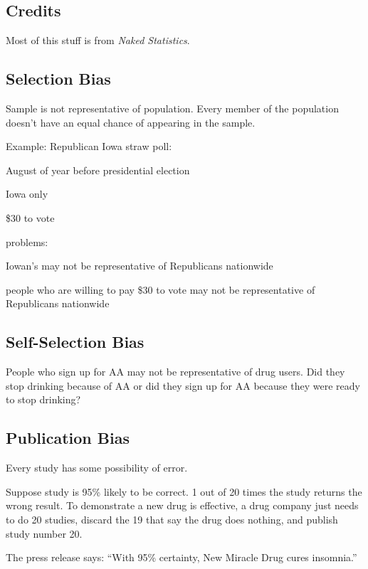 \documentclass[landscape]{exam}
\begin{document}
  \subsection{Credits}
  Most of this stuff is from {\em Naked Statistics}.

  \subsection{Selection Bias}
  Sample is not representative of population.  Every member of the population
  doesn't have an equal chance of appearing in the sample.

  Example: Republican Iowa straw poll:
  \begin{itemize*}
    \item August of year before presidential election
    \item Iowa only
    \item \$30 to vote
  \end{itemize*}

  problems:
  \begin{itemize*}
    \item Iowan's may not be representative of Republicans nationwide
    \item people who are willing to pay \$30 to vote may not be representative
      of Republicans nationwide
  \end{itemize*}

  \subsection{Self-Selection Bias}
  People who sign up for AA may not be representative of drug users.  Did they
  stop drinking because of AA or did they sign up for AA because they were
  ready to stop drinking?

  \subsection{Publication Bias}
  Every study has some possibility of error.

  Suppose study is 95\% likely to be correct.  1 out of 20 times the study
  returns the wrong result. To demonstrate a new drug is effective, a drug
  company just needs to do 20 studies, discard the 19 that say the drug does
  nothing, and publish study number 20.

  The press release says: ``With 95\% certainty, New Miracle Drug cures insomnia.''
\end{document}
